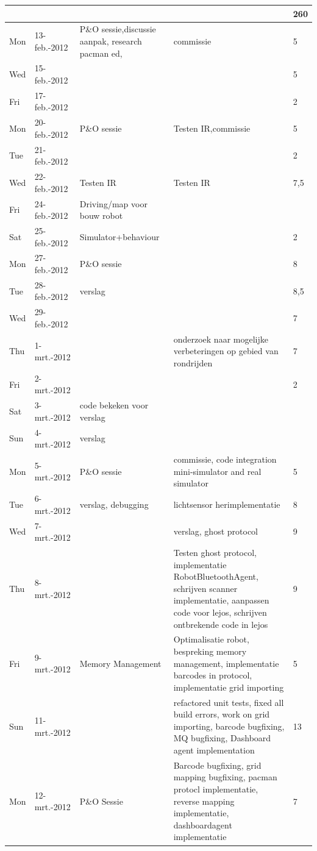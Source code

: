\documentclass[12pt,a4paper]{report}
\begin{document}
\begin{landscape}
\begin{longtable}{llp{7cm}p{10cm}l}
\hline
 &  &  &  & 260 \\ 
\hline
Mon & 13-feb.-2012 & P\&O sessie,discussie aanpak, research pacman ed,  & commissie & 5 \\ 
\hline
Wed & 15-feb.-2012 &  &  & 5 \\ 
\hline
Fri & 17-feb.-2012 &  &  & 2 \\ 
\hline
Mon & 20-feb.-2012 & P\&O sessie & Testen IR,commissie & 5 \\ 
\hline
Tue & 21-feb.-2012 &  &  & 2 \\ 
\hline
Wed & 22-feb.-2012 & Testen IR & Testen IR & 7,5 \\ 
\hline
Fri & 24-feb.-2012 & Driving/map voor bouw robot &  &  \\ 
\hline
Sat & 25-feb.-2012 & Simulator+behaviour &  & 2 \\ 
\hline
Mon & 27-feb.-2012 & P\&O sessie &  & 8 \\ 
\hline
Tue & 28-feb.-2012 & verslag &  & 8,5 \\ 
\hline
Wed & 29-feb.-2012 &  &  & 7 \\ 
\hline
Thu & 1-mrt.-2012 &  & onderzoek naar mogelijke verbeteringen op gebied van rondrijden & 7 \\ 
\hline
Fri & 2-mrt.-2012 &  &  & 2 \\ 
\hline
Sat & 3-mrt.-2012 & code bekeken voor verslag &  &  \\ 
\hline
Sun & 4-mrt.-2012 & verslag &  &  \\ 
\hline
Mon & 5-mrt.-2012 & P\&O sessie & commissie, code integration mini-simulator and real simulator & 5 \\ 
\hline
Tue & 6-mrt.-2012 & verslag, debugging & lichtsensor herimplementatie & 8 \\ 
\hline
Wed & 7-mrt.-2012 &  & verslag, ghost protocol & 9 \\ 
\hline
Thu & 8-mrt.-2012 &  & Testen ghost protocol, implementatie RobotBluetoothAgent, schrijven scanner implementatie, aanpassen code voor lejos, schrijven ontbrekende code in lejos & 9 \\ 
\hline
Fri & 9-mrt.-2012 & Memory Management & Optimalisatie robot, bespreking memory management, implementatie barcodes in protocol, implementatie grid importing & 5 \\ 
\hline
Sun & 11-mrt.-2012 &  & refactored unit tests, fixed all build errors, work on grid importing, barcode bugfixing, MQ bugfixing, Dashboard agent implementation & 13 \\ 
\hline
Mon & 12-mrt.-2012 & P\&O Sessie & Barcode bugfixing, grid mapping bugfixing, pacman protocl implementatie, reverse mapping implementatie, dashboardagent implementatie & 7 \\ 

\end{longtable}
\end{landscape}
\end{document}

